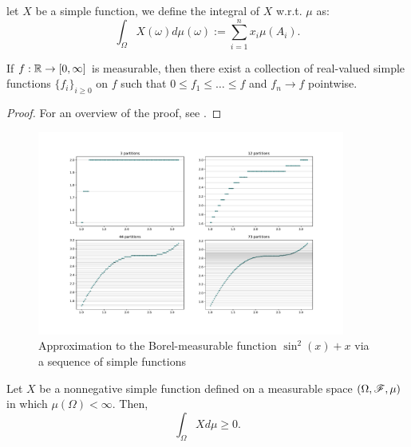 \documentclass[../TGMAFFIRO.tex]{subfiles}
\begin{document}
\begin{definition}
	let $X$ be a simple function, we define the integral of $X$ w.r.t. $\mu$ as:
	\begin{equation}
		\int_\Omega X(\omega) d\mu(\omega) := \sum_{i=1}^{n}x_i\mu(A_i).
	\end{equation}
\end{definition}


\begin{theorem}
	If $f:\mathbb{R}\to[0, \infty]$ is measurable, then there exist a collection of real-valued simple functions $\{f_i\}_{i\geq 0}$ on $f$ such that $0 \leq f_1 \leq \ldots \leq f$ and $f_n \to f$ pointwise.
\end{theorem}

\begin{proof}
	For an overview of the proof, see .
\end{proof}

\begin{figure}[h]
	\centering
	\includegraphics[width=0.9\textwidth]{../images/simple_sine.pdf}	
	\caption{Approximation to the Borel-measurable function $\sin^2(x) + x$ via a sequence of simple functions}
	\label{fig:simple_approx_sine}
\end{figure}

\begin{proposition} \label{prop:nnlmsf}
	Let $X$ be a nonnegative simple function defined on a measurable space $(\Omega, \mathscr{F}, \mu)$ in which $\mu(\Omega) < \infty$. Then,
	\begin{equation}
		\int_\Omega X d\mu \geq 0.
	\end{equation}
\end{proposition}
\end{document}

